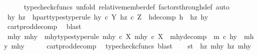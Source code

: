 \begin{isabellebody}
\ \ \ \ \isamarkupfalse%
\ {\isacharparenleft}{\kern0pt}typecheck{\isacharunderscore}{\kern0pt}cfuncs{\isacharcomma}{\kern0pt}\ unfold\ relative{\isacharunderscore}{\kern0pt}member{\isacharunderscore}{\kern0pt}def{}\ factors{\isacharunderscore}{\kern0pt}through{\isacharunderscore}{\kern0pt}def{}{\isacharcomma}{\kern0pt}\ auto{\isacharparenright}{\kern0pt}\isanewline
\ \ \isamarkupfalse%
\ \isamarkupfalse%
\ hy\ hz\ \ h{\isacharunderscore}{\kern0pt}part{\isacharunderscore}{\kern0pt}types{\isacharbrackleft}{\kern0pt}type{\isacharunderscore}{\kern0pt}rule{\isacharbrackright}{\kern0pt}{\isacharcolon}{\kern0pt}\ {\isachardoublequoteopen}hy\ {\isasymin}\isactrlsub c\ Y{\isachardoublequoteclose}\ {\isachardoublequoteopen}hz\ {\isasymin}\isactrlsub c\ Z{\isachardoublequoteclose}\ \ h{\isacharunderscore}{\kern0pt}decomp{\isacharcolon}{\kern0pt}\ {\isachardoublequoteopen}h\ {\isacharequal}{\kern0pt}\ {\isasymlangle}hz{\isacharcomma}{\kern0pt}\ hy{\isasymrangle}{\isachardoublequoteclose}\isanewline
\ \ \ \ \isamarkupfalse%
\ cart{\isacharunderscore}{\kern0pt}prod{\isacharunderscore}{\kern0pt}decomp\ \isamarkupfalse%
\ blast\isanewline
\ \ \isamarkupfalse%
\ \isamarkupfalse%
\ mhy{}\ mhy{}\ \ mhy{\isacharunderscore}{\kern0pt}types{\isacharbrackleft}{\kern0pt}type{\isacharunderscore}{\kern0pt}rule{\isacharbrackright}{\kern0pt}{\isacharcolon}{\kern0pt}\ {\isachardoublequoteopen}mhy{}\ {\isasymin}\isactrlsub c\ X{\isachardoublequoteclose}\ {\isachardoublequoteopen}mhy{}\ {\isasymin}\isactrlsub c\ X{\isachardoublequoteclose}\ \ mhy{\isacharunderscore}{\kern0pt}decomp{\isacharcolon}{\kern0pt}\ \ {\isachardoublequoteopen}m\ {\isasymcirc}\isactrlsub c\ hy\ {\isacharequal}{\kern0pt}\ {\isasymlangle}mhy{}{\isacharcomma}{\kern0pt}\ mhy{}{\isasymrangle}{\isachardoublequoteclose}\isanewline
\ \ \ \ \isamarkupfalse%
\ cart{\isacharunderscore}{\kern0pt}prod{\isacharunderscore}{\kern0pt}decomp\ \isamarkupfalse%
\ {\isacharparenleft}{\kern0pt}typecheck{\isacharunderscore}{\kern0pt}cfuncs{\isacharcomma}{\kern0pt}\ blast{\isacharparenright}{\kern0pt}\isanewline
\isanewline
\ \ \isamarkupfalse%
\ {\isachardoublequoteopen}{\isasymlangle}s{\isacharcomma}{\kern0pt}t{\isasymrangle}\ {\isacharequal}{\kern0pt}\ {\isasymlangle}{\isasymlangle}hz{\isacharcomma}{\kern0pt}\ mhy{}{\isasymrangle}{\isacharcomma}{\kern0pt}\ {\isasymlangle}hz{\isacharcomma}{\kern0pt}\ mhy{}{\isasymrangle}{\isasymrangle}{\isachardoublequoteclose}\isanewline

\end{isabellebody}
